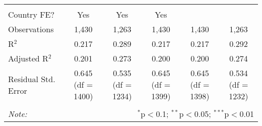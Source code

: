 \begin{table}[!htbp]
\begin{tabular}{@{\extracolsep{5pt}}lccccc}
  & & & & & \\ 
\hline \\[-1.8ex] 
Country FE? & Yes & Yes & Yes &  &  \\ 
Observations & 1,430 & 1,263 & 1,430 & 1,430 & 1,263 \\ 
R$^{2}$ & 0.217 & 0.289 & 0.217 & 0.217 & 0.292 \\ 
Adjusted R$^{2}$ & 0.201 & 0.273 & 0.200 & 0.200 & 0.274 \\ 
Residual Std. Error & 0.645 (df = 1400) & 0.535 (df = 1234) & 0.645 (df = 1399) & 0.645 (df = 1398) & 0.534 (df = 1232) \\ 
\hline 
\hline \\[-1.8ex] 
\textit{Note:}  & \multicolumn{5}{r}{$^{*}$p$<$0.1; $^{**}$p$<$0.05; $^{***}$p$<$0.01} \\ 
\end{tabular} 
\end{table} 
